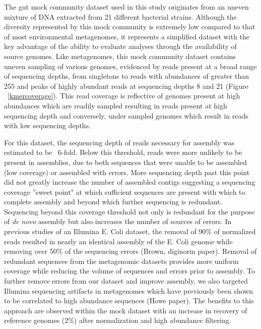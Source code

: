 \documentclass[11pt]{article} %
\begin{document}
The gut mock community dataset used in this study originates from an uneven mixture of DNA extracted from 21 different bacterial strains.  Although the diversity represented by this mock community is extremely low compared to that of most environmental metagenomes, it represents a simplified dataset with the key advantage of the ability to evaluate analyses through the availability of source genomes.  Like metagenomes, this mock community dataset contains uneven sampling of various genomes, evidenced by reads present at a broad range of sequencing depths, from singletons to reads with abundances of greater than 255 and peaks of highly abundant reads at sequencing depths 8 and 21 (Figure ~\ref{kmercoverage}).  This read coverage is reflective of genomes present at high abundances which are readily sampled resulting in reads present at high sequencing depth and conversely, under sampled genomes which result in reads with low sequencing depths.  

For this dataset, the sequencing depth of reads necessary for assembly was estimated to be ~6-fold.  Below this threshold, reads were more unlikely to be present in assemblies, due to both sequences that were unable to be assembled (low coverage) or assembled with errors.  More sequencing depth past this point did not greatly increase the number of assembled contigs suggesting a sequencing coverage ''sweet point" at which sufficient sequences are present with which to complete assembly and beyond which further sequencing is redundant.  Sequencing beyond this coverage threshold not only is redundant for the purpose of \emph{de novo} assembly but also increases the number of sources of errors.  In previous studies of an Illumina E. Coli dataset, the removal of 90\% of normalized reads resulted in nearly an identical assembly of the E. Coli genome while removing over 50\% of the sequencing errors (Brown, diginorm paper).  Removal of redundant sequences from the metagenomic datasets provides more uniform coverage while reducing the volume of sequences and errors prior to assembly.    To further remove errors from our dataset and improve assembly, we also targeted Illumina sequencing artifacts in metagenomes which have previously been shown to be correlated to high abundance sequences (Howe paper).  The benefits to this approach are observed within the mock dataset with an increase in recovery of reference genomes (2\%) after normalization and high abundance filtering.
\end{document}
